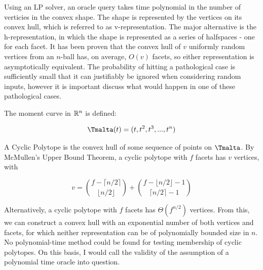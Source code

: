 Using an LP solver, an oracle query takes time polynomial in the number of verticies in the convex shape. The shape is represented by the vertices on its convex hull, which is referred to as v-representation. The major alternative is the h-representation, in which the shape is represented as a series of halfspaces - one for each facet. It has been proven %
that the convex hull of $v$ uniformly random vertices from an $n$-ball has, on average, $O(v)$ facets, so either representation is asymptotically equivalent. The probability of hitting a pathological case is sufficiently small that it can justifiably be ignored when considering random inputs, however it is important discuss what would happen in one of these pathological cases.

The moment curve in $\mathbb{R}^n$ is defined:

$$
\tengm(t) = (t, t^2, t^3, ..., t^n)
$$

A Cyclic Polytope is the convex hull of some sequence of points on $\tengm$. By McMullen's Upper Bound Theorem, a cyclic polytope with $f$ facets has $v$ vertices, with

$$
v = {{f-\lceil n/2 \rceil}\choose{\lfloor {n/2} \rfloor}} + {{f-\lfloor n/2 \rfloor -1} \choose {\lceil {n/2} \rceil - 1}}
$$

Alternatively, a cyclic polytope with $f$ facets has $\Theta(f^{n/2})$ vertices. From this, we can construct a convex hull with an exponential number of both vertices and facets, for which neither representation can be of polynomially bounded size in $n$. No polynomial-time method could be found for testing membership of cyclic polytopes. On this basis, I would call the validity of the assumption of a polynomial time oracle into question. 